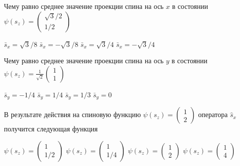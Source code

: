 \documentclass[11pt,a4paper]{exam}
\begin{document}
\begin{questions}
\question Чему равно среднее значение проекции спина на ось $x$ в состоянии $\psi ({s_z}) = \left( {\begin{array}{*{20}{c}}
{\sqrt 3 /2}\\
{1/2}
\end{array}} \right)$
\begin{choices}
\choice ${\bar s_x} = \sqrt 3 /8$     
\choice ${\bar s_x} =  - \sqrt 3 /8$     
\choice ${\bar s_x} = \sqrt 3 /4$     
\choice ${\bar s_x} =  - \sqrt 3 /4$
\end{choices}

\question Чему равно среднее значение проекции спина на ось $y$ в состоянии $\psi ({s_z}) = \frac{1}{{\sqrt 2 }}\left( {\begin{array}{*{20}{c}}
1\\
1
\end{array}} \right)$
\begin{choices}
\choice ${\bar s_y} =  - 1/4$      
\choice ${\bar s_y} = 1/4$      
\choice ${\bar s_y} = 1/3$      
\choice ${\bar s_y} = 0$
\end{choices}

\question В результате действия на спиновую функцию $\psi ({s_z}) = \left( {\begin{array}{*{20}{c}}
1\\
2
\end{array}} \right)$ оператора ${\hat s_x}$ получится следующая функция
\begin{choices}
\choice $\psi ({s_z}) = \left( {\begin{array}{*{20}{c}}
1\\
{1/2}
\end{array}} \right)$   
\choice $\psi ({s_z}) = \left( {\begin{array}{*{20}{c}}
1\\
{1/4}
\end{array}} \right)$   
\choice $\psi ({s_z}) = \left( {\begin{array}{*{20}{c}}
1\\
2
\end{array}} \right)$   
\choice $\psi ({s_z}) = \left( {\begin{array}{*{20}{c}}
1\\
4
\end{array}} \right)$
\end{choices}


\end{questions}
\end{document}
